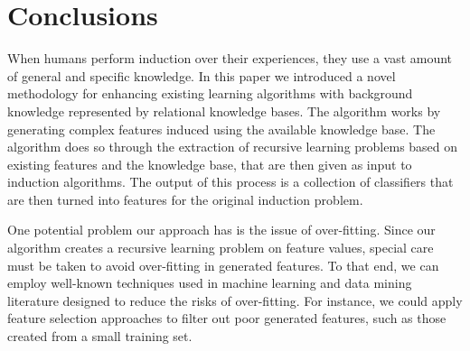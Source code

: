 \documentclass[twoside,11pt]{article}
\theoremstyle{definition}
\begin{document}

\section{Conclusions}

When humans perform induction over their experiences, they use a vast amount of general and specific knowledge. In this paper we introduced a novel methodology for enhancing existing learning algorithms with background knowledge represented by relational knowledge bases.
The algorithm works by generating complex features induced using the available knowledge base. The algorithm does so through the extraction of recursive learning problems based on existing features and the knowledge base, that are then given as input to induction algorithms. The output of this process is a collection of classifiers that are then turned into features for the original induction problem.

One potential problem our approach has is the issue of over-fitting. Since our algorithm creates a recursive learning problem on feature values, special care must be taken to avoid over-fitting in generated features. To that end, we can employ well-known techniques used in machine learning and data mining literature designed to reduce the risks of over-fitting. For instance, we could apply feature selection approaches to filter out poor generated features, such as those created from a small training set.
\end{document}
